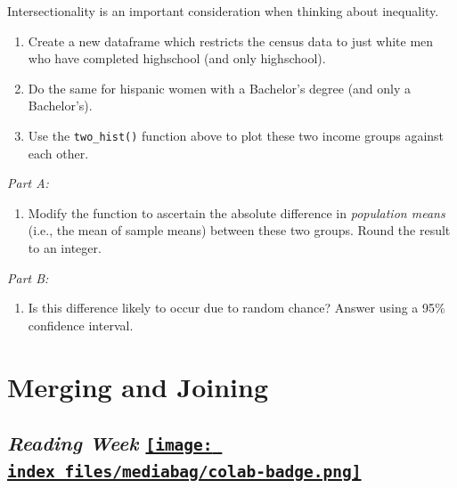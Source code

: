 \documentclass[
  letterpaper,
  DIV=11,
  numbers=noendperiod]{scrreprt}
\providecommand{\tightlist}{%
  \setlength{\itemsep}{0pt}\setlength{\parskip}{0pt}}\usepackage{longtable,booktabs,array}
\begin{document}
Intersectionality is an important consideration when thinking about
inequality.

\begin{enumerate}
\def\labelenumi{\arabic{enumi}.}
\tightlist
\item
  Create a new dataframe which restricts the census data to just white
  men who have completed highschool (and only highschool).
\item
  Do the same for hispanic women with a Bachelor's degree (and only a
  Bachelor's).
\item
  Use the \texttt{two\_hist()} function above to plot these two income
  groups against each other.
\end{enumerate}

\emph{Part A:}

\begin{enumerate}
\def\labelenumi{\arabic{enumi}.}
\setcounter{enumi}{3}
\tightlist
\item
  Modify the function to ascertain the absolute difference in
  \emph{population means} (i.e., the mean of sample means) between these
  two groups. Round the result to an integer.
\end{enumerate}

\emph{Part B:}

\begin{enumerate}
\def\labelenumi{\arabic{enumi}.}
\setcounter{enumi}{4}
\tightlist
\item
  Is this difference likely to occur due to random chance? Answer using
  a 95\% confidence interval.
\end{enumerate}


\hypertarget{merging-and-joining}{%
\chapter{Merging and Joining}\label{merging-and-joining}}

\hypertarget{reading-week-open-in-colab}{%
\section[\emph{Reading Week} ]{\texorpdfstring{\emph{Reading Week}
\href{https://colab.research.google.com/github/oballinger/QM2/blob/main/notebooks/RW.\%20Merging\%20and\%20Joining.ipynb}{\protect\texttt{[image: index\_files/mediabag/colab-badge.png]}}}{Reading Week Open In Colab}}\label{reading-week-open-in-colab}}
\end{document}
